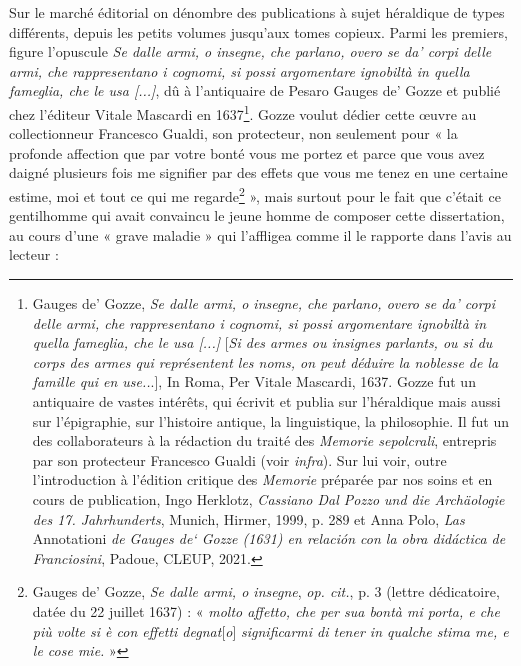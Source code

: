 \documentclass[12pt,twoside,openany]{book}
\begin{document}
Sur le marché éditorial on dénombre des publications à sujet héraldique de types différents, depuis les petits volumes jusqu’aux tomes copieux. Parmi les premiers, figure l’opuscule \textit{Se dalle armi, o insegne, che parlano, overo se da’ corpi delle armi, che rappresentano i cognomi, si possi argomentare ignobiltà in quella fameglia, che le usa [...]}, dû à l’antiquaire de Pesaro Gauges de’ Gozze et publié chez l’éditeur Vitale Mascardi en 1637\footnote{Gauges de’ Gozze, \textit{Se dalle armi, o insegne, che parlano, overo se da’ corpi delle armi, che rappresentano i cognomi, si possi argomentare ignobiltà in quella fameglia, che le usa [...]} [\textit{Si des armes ou insignes parlants, ou si du corps des armes qui représentent les noms, on peut déduire la noblesse de la famille qui en use..}.], In Roma, Per Vitale Mascardi, 1637. Gozze fut un antiquaire de vastes intérêts, qui écrivit et publia sur l’héraldique mais aussi sur l’épigraphie, sur l’histoire antique, la linguistique, la philosophie. Il fut un des collaborateurs à la rédaction du traité des \textit{Memorie sepolcrali}, entrepris par son protecteur Francesco Gualdi (voir \textit{infra}). Sur lui voir, outre l’introduction à l’édition critique des \textit{Memorie} préparée par nos soins et en cours de publication, Ingo Herklotz, \textit{Cassiano Dal Pozzo und die Archäologie des 17. Jahrhunderts}, Munich, Hirmer, 1999, p. 289 et Anna Polo, \textit{Las }Annotationi \textit{de Gauges de‘ Gozze (1631) en relación con la obra didáctica de Franciosini}, Padoue, CLEUP, 2021.}. Gozze voulut dédier cette œuvre au collectionneur Francesco Gualdi, son protecteur, non seulement pour « la profonde affection que par votre bonté vous me portez et parce que vous avez daigné plusieurs fois me signifier par des effets que vous me tenez en une certaine estime, moi et tout ce qui me regarde\footnote{Gauges de’ Gozze, \textit{Se dalle armi, o insegne},\textit{ op. cit.}, p. 3 (lettre dédicatoire, datée du 22 juillet 1637) : « \textit{molto affetto, che per sua bontà mi porta, e che più volte si è con effetti degnat}[\textit{o}]\textit{ significarmi di tener in qualche stima me, e le cose mie. }»} », mais surtout pour le fait que c’était ce gentilhomme qui avait convaincu le jeune homme de composer cette dissertation, au cours d’une « grave maladie » qui l’affligea comme il le rapporte dans l’avis au lecteur :
\end{document}
